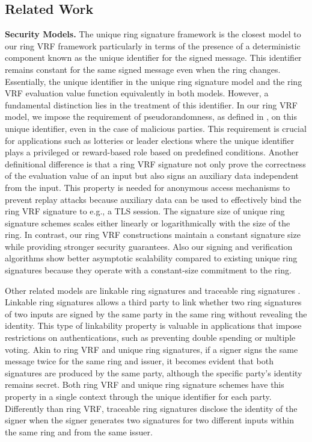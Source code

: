 
\subsection{Related Work}


\noindent\textbf{Security Models.} The unique ring signature framework \cite{URCframework} is the closest model to our ring VRF framework particularly in terms of the presence of a deterministic component known as the unique identifier for the signed message. This identifier remains constant for the same signed message even when the ring changes.  Essentially, the unique identifier in the unique ring signature model and the ring VRF evaluation value function equivalently in both models. However, a fundamental distinction lies in the treatment of this identifier. In our ring VRF model, we impose the requirement of pseudorandomness, as defined in \cite{ucvrf,praos}, on this unique identifier, even in the case of malicious parties.
This requirement is crucial for applications such as lotteries or leader elections where the unique identifier plays a privileged or reward-based role based on predefined conditions. Another definitional difference is that a ring VRF  signature not only prove the correctness of the evaluation value of an input but also signs an auxiliary data independent from the input. This property is needed for anonymous access mechanisms to prevent replay attacks because auxiliary data can be used to effectively bind the ring VRF signature to e.g., a TLS session.
The signature size of unique ring signature schemes scales either linearly \cite{URCframework,URCfc} or logarithmically  \cite{URCblockchainprivacy,URClattice} with the size of the ring. In contrast, our ring VRF constructions maintain a constant signature size while providing stronger security guarantees. Also our signing and verification algorithms show better asymptotic scalability compared to existing unique ring signatures because they operate with a constant-size  commitment to the ring.

Other related models are linkable ring signatures \cite{ring_linkable,ring_linkablee} and traceable ring signatures \cite{traceable07,traceable_sub}. Linkable ring signatures allows a third party to link whether two ring signatures of two inputs are signed by the same party in the same ring without revealing the identity. This type of linkability property is valuable in applications that impose restrictions on authentications, such as preventing double spending or multiple voting. Akin to ring VRF and unique ring signatures, if a signer signs the same message twice for the same ring and issuer, it becomes evident that both signatures are produced by the same party, although the specific party's identity remains secret. Both ring VRF and unique ring signature schemes have this property in a single context through the unique identifier for each party.
Differently than ring VRF, traceable ring signatures  disclose the identity of the signer when the signer generates two signatures for two different inputs within the same ring and from the same issuer.

